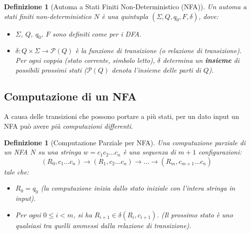 \documentclass[a4paper, 11pt]{book} %
\newtheorem{definition}[theorem]{Definizione}
\theoremstyle{definition}
\begin{document}
\begin{definition}[Automa a Stati Finiti Non-Deterministico (NFA)]
Un automa a stati finiti non-deterministico $N$ è una quintupla $( \Sigma, Q, q_0, F, \delta )$, dove:
\begin{itemize}
    \item $\Sigma$, $Q$, $q_0$, $F$ sono definiti come per i DFA.
    \item $\delta: Q \times \Sigma \to \mathcal{P}(Q)$ è la funzione di transizione (o relazione di transizione). Per ogni coppia (stato corrente, simbolo letto), $\delta$ determina un \textbf{insieme} di possibili prossimi stati ($\mathcal{P}(Q)$ denota l'insieme delle parti di $Q$).
\end{itemize}
\end{definition}

\subsection{Computazione di un NFA}
A causa delle transizioni che possono portare a più stati, per un dato input un NFA può avere \emph{più computazioni differenti}.

\begin{definition}[Computazione Parziale per NFA]
Una \emph{computazione parziale} di un NFA $N$ su una stringa $w = c_1 c_2 \dots c_n$ è una sequenza di $m+1$ configurazioni:
\[ (R_0, c_1 \dots c_n) \xrightarrow{} (R_1, c_2 \dots c_n) \xrightarrow{} \dots \xrightarrow{} (R_m, c_{m+1} \dots c_n) \]
tale che:
\begin{itemize}
    \item $R_0 = q_0$ (la computazione inizia dallo stato iniziale con l'intera stringa in input).
    \item Per ogni $0 \leq i < m$, si ha $R_{i+1} \in \delta(R_i, c_{i+1})$. (Il prossimo stato è uno qualsiasi tra quelli ammessi dalla relazione di transizione).
\end{itemize}
\end{definition}
\end{document}
